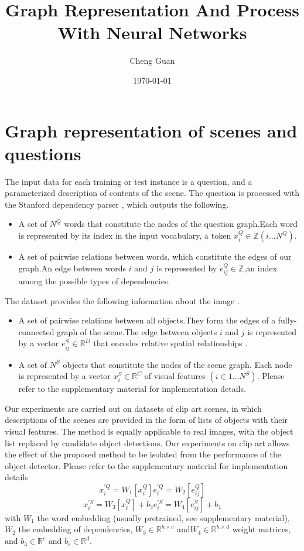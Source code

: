 \documentclass[10pt,twocolumn,a4paper]{article}
\title{Graph Representation And Process With Neural Networks}
\author{Cheng Guan}
\date{\today}
\begin{document}
\maketitle
\section{Graph representation of scenes and questions}
The input data for each training or test instance is a question,
and a parameterized description of contents of the scene.
The question is processed with the Stanford dependency parser \cite{c1},
which outputs the following.
\begin{itemize}
\item A set of $N^Q$ words that constitute the nodes of the question graph.Each word is represented by its index in the input vocabulary, a token $x_{i}^{Q}\in \mathbb{Z}\left ( i...N^{Q} \right )$.
\item A set of pairwise relations between words, which constitute the edges of our graph.An edge between words $i$ and $j$ is represented by $e_{ij}^{Q}\in \mathbb{Z}$,an index among the possible types of dependencies.
\end{itemize}

The dataset provides the following information about the image .
\begin{itemize}
\item A set of pairwise relations between all objects.They form the edges of a fully-connected graph of the scene.The edge between objects $i$ and $j$ is represented by a vector $e_{ij}^S \in \mathbb{R}^{D}$ that encodes relative spatial relationships .
\item A set of $N^S$ objects that constitute the nodes of the scene graph. Each node is represented by a vector $x_i^S \in \mathbb{R}^C$ of visual features $\left(i \in 1...N^S\right)$. Please refer to the supplementary material for implementation details.
\end{itemize}
Our experiments are carried out on datasets of clip art scenes, in which descriptions of
the scenes are provided in the form of lists of objects with their visual features.
The method is equally applicable to real images,
with the object list replaced by candidate object detections. Our experiments on clip art allows the effect of the proposed method to be isolated from the performance of the object detector.
Please refer to the supplementary material for implementation details
\begin{equation}
x_{i}^{'Q}= W_1[x_i^Q]  e_{i}^{'Q}=W_2[e_{ij}^Q]
\end{equation}
\begin{equation}
x_{i}^{'S}= W_3[x_i^Q]+b_3  e_{i}^{'S}=W_4[e_{ij}^S]+b_4
\end{equation}
with $W_1$ the word embedding (usually pretrained, see supplementary material), $W_2$ the embedding of dependencies, $W_3 \in \mathbb{R}^{h\times c}$  and$W_4 \in \mathbb{R}^{h\times d}$  weight matrices, and $b_3 \in \mathbb{R}^c$ and $b_r \in \mathbb{R}^d$.

\end{document}
